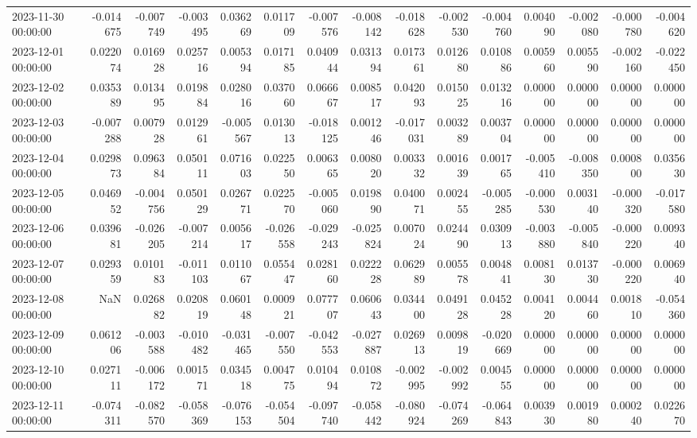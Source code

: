 \begin{tabular}{lrrrrrrrrrrrrrr}
2023-11-30 00:00:00 & -0.014675 & -0.007749 & -0.003495 & 0.036269 & 0.011709 & -0.007576 & -0.008142 & -0.018628 & -0.002530 & -0.004760 & 0.004090 & -0.002080 & -0.000780 & -0.004620 \\
2023-12-01 00:00:00 & 0.022074 & 0.016928 & 0.025716 & 0.005394 & 0.017185 & 0.040944 & 0.031394 & 0.017361 & 0.012680 & 0.010886 & 0.005960 & 0.005590 & -0.002160 & -0.022450 \\
2023-12-02 00:00:00 & 0.035389 & 0.013495 & 0.019884 & 0.028016 & 0.037060 & 0.066667 & 0.008517 & 0.042093 & 0.015025 & 0.013216 & 0.000000 & 0.000000 & 0.000000 & 0.000000 \\
2023-12-03 00:00:00 & -0.007288 & 0.007928 & 0.012961 & -0.005567 & 0.013013 & -0.018125 & 0.001246 & -0.017031 & 0.003289 & 0.003704 & 0.000000 & 0.000000 & 0.000000 & 0.000000 \\
2023-12-04 00:00:00 & 0.029873 & 0.096384 & 0.050111 & 0.071603 & 0.022550 & 0.006365 & 0.008020 & 0.003332 & 0.001639 & 0.001765 & -0.005410 & -0.008350 & 0.000800 & 0.035630 \\
2023-12-05 00:00:00 & 0.046952 & -0.004756 & 0.050129 & 0.026771 & 0.022570 & -0.005060 & 0.019890 & 0.040071 & 0.002455 & -0.005285 & -0.000530 & 0.003140 & -0.000320 & -0.017580 \\
2023-12-06 00:00:00 & 0.039681 & -0.026205 & -0.007214 & 0.005617 & -0.026558 & -0.029243 & -0.025824 & 0.007024 & 0.024490 & 0.030913 & -0.003880 & -0.005840 & -0.000220 & 0.009340 \\
2023-12-07 00:00:00 & 0.029359 & 0.010183 & -0.011103 & 0.011067 & 0.055447 & 0.028160 & 0.022228 & 0.062989 & 0.005578 & 0.004841 & 0.008130 & 0.013730 & -0.000220 & 0.006940 \\
2023-12-08 00:00:00 & NaN & 0.026882 & 0.020819 & 0.060148 & 0.000921 & 0.077707 & 0.060643 & 0.034400 & 0.049128 & 0.045228 & 0.004120 & 0.004460 & 0.001810 & -0.054360 \\
2023-12-09 00:00:00 & 0.061206 & -0.003588 & -0.010482 & -0.031465 & -0.007550 & -0.042553 & -0.027887 & 0.026913 & 0.009819 & -0.020669 & 0.000000 & 0.000000 & 0.000000 & 0.000000 \\
2023-12-10 00:00:00 & 0.027111 & -0.006172 & 0.001571 & 0.034518 & 0.004775 & 0.010494 & 0.010872 & -0.002995 & -0.002992 & 0.004555 & 0.000000 & 0.000000 & 0.000000 & 0.000000 \\
2023-12-11 00:00:00 & -0.074311 & -0.082570 & -0.058369 & -0.076153 & -0.054504 & -0.097740 & -0.058442 & -0.080924 & -0.074269 & -0.064843 & 0.003930 & 0.001980 & 0.000240 & 0.022670 \\

\end{tabular}
